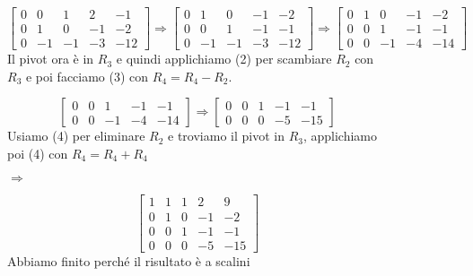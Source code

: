 \begin{figure}[h!]
    \begin{minipage}{1\linewidth}
        \centering
        \[
            \begin{bmatrix}
            0 & 0 & 1 & 2 & -1\\
            0 & 1 & 0 & -1 & -2\\
            0 & -1 & -1 & -3 & -12
            \end{bmatrix}
            \Rightarrow
            \begin{bmatrix}
            0 & 1 & 0 & -1 & -2\\
            0 & 0 & 1 & -1 & -1\\
            0 & -1 & -1 & -3 & -12
            \end{bmatrix}
            \Rightarrow
            \begin{bmatrix}
            0 & 1 & 0 & -1 & -2\\
            0 & 0 & 1 & -1 & -1\\
            0 & 0 & -1 & -4 & -14
            \end{bmatrix}
        \]
        Il pivot ora è in $R_3$ e quindi applichiamo (2) per scambiare $R_2$ con $R_3$ e poi facciamo (3) con $R_4 = R_4 - R_2$.
    \end{minipage}
\end{figure}
\vspace{-15pt}
\begin{figure}[h!]
    \begin{minipage}{.45\linewidth}
        \centering
        \[
            \begin{bmatrix}
            0 & 0 & 1 & -1 & -1\\
            0 & 0 & -1 & -4 & -14
            \end{bmatrix}
            \Rightarrow
            \begin{bmatrix}
            0 & 0 & 1 & -1 & -1\\
            0 & 0 & 0 & -5 & -15
            \end{bmatrix}
        \]
        Usiamo (4) per eliminare $R_2$ e troviamo il pivot in $R_3$, applichiamo poi (4) con $R_4 = R_4 + R_4$
    \end{minipage}
    \hspace{1cm}
    $\Longrightarrow$
    \hspace{-1cm}
    \begin{minipage}{.45\linewidth}
        \centering
        \[
            \begin{bmatrix}
            1 & 1 & 1 & 2 & 9\\
            0 & 1 & 0 & -1 & -2\\
            0 & 0 & 1 & -1 & -1\\
            0 & 0 & 0 & -5 & -15
            \end{bmatrix}
        \]
        Abbiamo finito perché il risultato è a scalini    
\end{minipage}
\end{figure}
